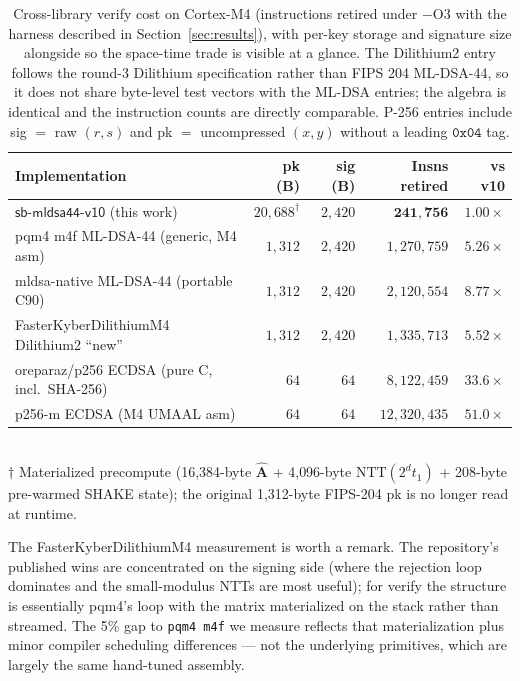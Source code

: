 \documentclass[11pt,a4paper]{article}
\newcommand{\NTT}{\mathrm{NTT}}
\begin{document}
\begin{table}[h]
\centering
\caption{Cross-library verify cost on Cortex-M4 (instructions retired
under $-$O3 with the harness described in
Section~\ref{sec:results}), with per-key storage and signature size
alongside so the space-time trade is visible at a glance. The
Dilithium2 entry follows the round-3 Dilithium specification rather
than FIPS 204 ML-DSA-44, so it does not share byte-level test
vectors with the ML-DSA entries; the algebra is identical and the
instruction counts are directly comparable. P-256 entries
include sig $=$ raw $(r,s)$ and pk $=$ uncompressed $(x,y)$ without
a leading $\mathtt{0x04}$ tag.}
\label{tab:cross}
\begin{tabular}{l r r r r}
\toprule
Implementation                              & pk (B)      & sig (B)   & Insns retired       & vs \textsf{v10} \\
\midrule
$\textsf{sb-mldsa44-v10}$ (this work)        & $20{,}688^\dagger$ & $2{,}420$ & $\mathbf{241{,}756}$ & $1.00\times$ \\
pqm4 m4f ML-DSA-44 (generic, M4 asm)         & $1{,}312$   & $2{,}420$ & $1{,}270{,}759$      & $5.26\times$ \\
mldsa-native ML-DSA-44 (portable C90)        & $1{,}312$   & $2{,}420$ & $2{,}120{,}554$      & $8.77\times$ \\
\midrule
FasterKyberDilithiumM4 Dilithium2 ``new''~\cite{fkd} & $1{,}312$ & $2{,}420$ & $1{,}335{,}713$ & $5.52\times$ \\
\midrule
oreparaz/p256 ECDSA (pure C, incl.\ SHA-256) & $64$        & $64$      & $8{,}122{,}459$      & $33.6\times$ \\
p256-m ECDSA (M4 UMAAL asm)                  & $64$        & $64$      & $12{,}320{,}435$     & $51.0\times$ \\
\bottomrule
\end{tabular}
\\[2pt]
\footnotesize $\dagger$ Materialized precompute (16{,}384-byte
$\hat{\mathbf{A}}$ + 4{,}096-byte $\NTT(2^d t_1)$ + 208-byte
pre-warmed SHAKE state); the original 1{,}312-byte FIPS-204 pk is no
longer read at runtime.
\end{table}

The FasterKyberDilithiumM4 measurement is worth a remark. The repository's
published wins are concentrated on the signing side (where the rejection
loop dominates and the small-modulus NTTs are most useful); for verify
the structure is essentially pqm4's loop with the matrix materialized
on the stack rather than streamed. The 5\% gap to \texttt{pqm4 m4f} we
measure reflects that materialization plus minor compiler scheduling
differences --- not the underlying primitives, which are largely the
same hand-tuned assembly.
\end{document}
